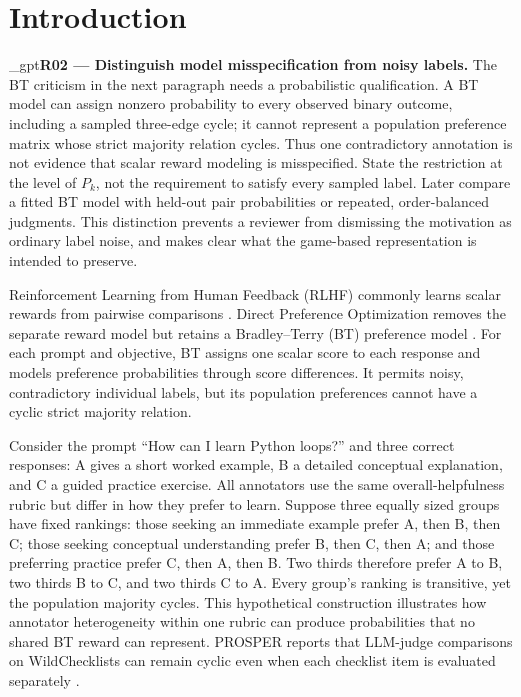 \documentclass{article}
\newif\ifshowreviews
\newcommand{\reviewresponse}[1]{%
  \ifshowreviews
  \par\begingroup\color{blue!65!black}\hypersetup{allcolors=blue!65!black}\emergencystretch=2em%
  \noindent\textbf{Response:} #1\par\endgroup
  \fi}
\theoremstyle{remark}
\theoremstyle{plain}
\begin{document}
\section{Introduction}
\label{sec:intro}
\kekim_gpt{\textbf{R02 --- Distinguish model misspecification from noisy labels.} The BT criticism in the next paragraph needs a probabilistic qualification. A BT model can assign nonzero probability to every observed binary outcome, including a sampled three-edge cycle; it cannot represent a population preference matrix whose strict majority relation cycles. Thus one contradictory annotation is not evidence that scalar reward modeling is misspecified. State the restriction at the level of $P_k$, not the requirement to satisfy every sampled label. Later compare a fitted BT model with held-out pair probabilities or repeated, order-balanced judgments. This distinction prevents a reviewer from dismissing the motivation as ordinary label noise, and makes clear what the game-based representation is intended to preserve.}
\reviewresponse{\textbf{R02 --- Partially addressed.} The motivation concerns population preference matrices, not isolated contradictory labels. UF's rating-induced supervision is transitive. The separate $60{,}000$-judgment audit finds neither significant repeated-cycle excess over its fitted BT control nor a resolved frozen-GPM predictive advantage. This is inconclusive evidence about direct feedback, not proof of transitivity.}

Reinforcement Learning from Human Feedback (RLHF) commonly learns scalar rewards from pairwise comparisons \citep{christiano2017deep,ouyang2022training}. Direct Preference Optimization removes the separate reward model but retains a Bradley--Terry (BT) preference model \citep{rafailov2023direct,bradley1952rank}. For each prompt and objective, BT assigns one scalar score to each response and models preference probabilities through score differences. It permits noisy, contradictory individual labels, but its population preferences cannot have a cyclic strict majority relation.

Consider the prompt ``How can I learn Python loops?'' and three correct responses: A gives a short worked example, B a detailed conceptual explanation, and C a guided practice exercise. All annotators use the same overall-helpfulness rubric but differ in how they prefer to learn. Suppose three equally sized groups have fixed rankings: those seeking an immediate example prefer A, then B, then C; those seeking conceptual understanding prefer B, then C, then A; and those preferring practice prefer C, then A, then B. Two thirds therefore prefer A to B, two thirds B to C, and two thirds C to A. Every group's ranking is transitive, yet the population majority cycles. This hypothetical construction illustrates how annotator heterogeneity within one rubric can produce probabilities that no shared BT reward can represent. PROSPER reports that LLM-judge comparisons on WildChecklists can remain cyclic even when each checklist item is evaluated separately \citep{zhang2026prosper}.
\end{document}
